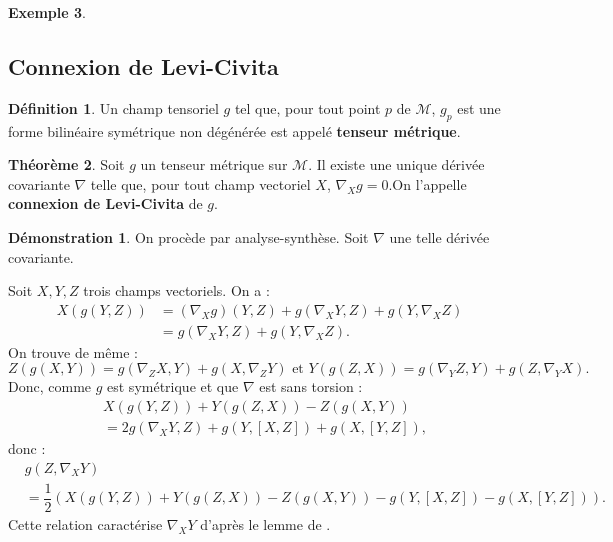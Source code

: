 \documentclass[12pt,a4paper]{article}
\theoremstyle{definition}
\newtheorem{thm}{Théorème}
\newtheorem{defn}[thm]{Définition}
\newtheorem{ex}[thm]{Exemple}
\newtheorem*{dem}{Démonstration}
\begin{document}
\begin{ex}
\subsection{Connexion de Levi-Civita}
\begin{defn}
Un champ tensoriel $g$ tel que, pour tout point $p$ de $\mathcal{M}$, $g_p$ est une forme bilinéaire symétrique non dégénérée est appelé \textbf{tenseur métrique}.
\end{defn}
\begin{thm}
Soit $g$ un tenseur métrique sur $\mathcal{M}$. Il existe une unique dérivée covariante $\nabla$ telle que, pour tout champ vectoriel $X$, $\nabla_Xg=0$.\newline On l'appelle \textbf{connexion de Levi-Civita} de $g$.
\end{thm}
\begin{dem}
On procède par analyse-synthèse. Soit $\nabla$ une telle dérivée covariante.

Soit $X,Y,Z$ trois champs vectoriels. On a :
\begin{align*}
X (g(Y,Z))&=(\nabla_Xg)(Y,Z)+g(\nabla_XY,Z)+g(Y,\nabla_XZ)\\&=g(\nabla_XY,Z)+g(Y,\nabla_XZ).
\end{align*}
On trouve de même :
$$
Z(g(X,Y))=g(\nabla_ZX,Y)+g(X,\nabla_ZY)\text{ et }Y(g(Z,X))=g(\nabla_YZ,Y)+g(Z,\nabla_YX).
$$
Donc, comme $g$ est symétrique et que $\nabla$ est sans torsion :
\begin{align*}
&X(g(Y,Z))+Y(g(Z,X))-Z(g(X,Y))\\&=2g(\nabla_XY,Z)+g(Y,[X,Z])+g(X,[Y,Z]),
\end{align*}
donc :
\begin{align*}
&g(Z,\nabla_XY)\\&=\dfrac{1}{2}\left(X(g(Y,Z))+Y(g(Z,X))-Z(g(X,Y))-g(Y,[X,Z])-g(X,[Y,Z])\right).
\end{align*}
Cette relation caractérise $\nabla_XY$ d'après le lemme de .


\end{dem}
\end{ex}
\end{document}
